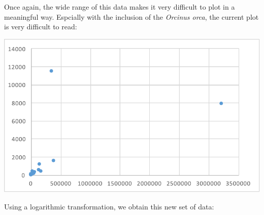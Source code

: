 \documentclass[10pt,letterpaper]{article}
\begin{document}
			Once again, the wide range of this data makes it very difficult to plot in a meaningful way. Espcially with the inclusion of the \emph{Orcinus orca}, the current plot is very difficult to read:
			\newline \newline
			\centerline{\includegraphics{Picture7.pdf}}
			\newline \newline 
			Using a logarithmic transformation, we obtain this new set of data:
\end{document}
